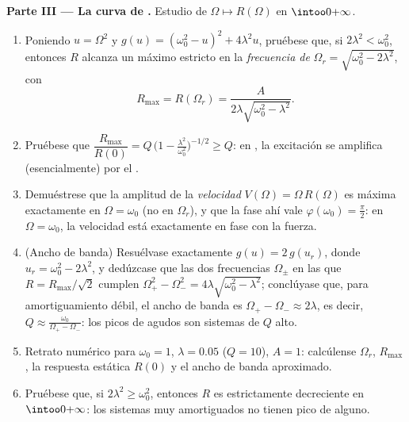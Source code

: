 \begin{problem}
\medskip
\noindent\textbf{Parte III --- La curva de .} Estudio de
$\Omega \mapsto R(\Omega)$ en $\intoo0{+\infty}$.
\begin{enumerate}[resume]
  \item Poniendo $u = \Omega^2$ y $g(u) = (\omega_0^2 - u)^2 +
        4\lambda^2 u$, pruébese que, si $2\lambda^2 < \omega_0^2$,
        entonces $R$ alcanza un máximo estricto en la
        \emph{frecuencia de } $\Omega_r =
        \sqrt{\omega_0^2 - 2\lambda^2}$, con
        \[
        R_{\max} = R(\Omega_r)
        = \frac{A}{2\lambda\sqrt{\omega_0^2 - \lambda^2}} .
        \]
  \item Pruébese que $\dfrac{R_{\max}}{R(0)} = Q\,\bigl(1 -
        \tfrac{\lambda^2}{\omega_0^2}\bigr)^{-1/2} \geq Q$: en
        , la excitación se amplifica (esencialmente) por
        el .
  \item Demuéstrese que la amplitud de la \emph{velocidad}
        $V(\Omega) = \Omega\,R(\Omega)$ es máxima exactamente en
        $\Omega = \omega_0$ (no en $\Omega_r$), y que la fase ahí vale
        $\varphi(\omega_0) = \frac\pi2$: en $\Omega = \omega_0$, la
        velocidad está exactamente en fase con la fuerza.
  \item (Ancho de banda) Resuélvase exactamente $g(u) = 2\,g(u_r)$,
        donde $u_r = \omega_0^2 - 2\lambda^2$, y dedúzcase que las dos
        frecuencias $\Omega_\pm$ en las que $R = R_{\max}/\sqrt2$
        cumplen $\Omega_+^2 - \Omega_-^2 = 4\lambda\sqrt{\omega_0^2 -
        \lambda^2}$; conclúyase que, para amortiguamiento débil, el
        ancho de banda es $\Omega_+ - \Omega_- \approx 2\lambda$, es
        decir, $Q \approx \frac{\omega_0}{\Omega_+ - \Omega_-}$: los
        picos de  agudos son sistemas de $Q$ alto.
  \item Retrato numérico para $\omega_0 = 1$, $\lambda = 0.05$
        ($Q = 10$), $A = 1$: calcúlense $\Omega_r$, $R_{\max}$, la
        respuesta estática $R(0)$ y el ancho de banda aproximado.
  \item Pruébese que, si $2\lambda^2 \geq \omega_0^2$, entonces $R$ es
        estrictamente decreciente en $\intoo0{+\infty}$: los sistemas
        muy amortiguados no tienen pico de  alguno.
\end{enumerate}


\end{problem}
